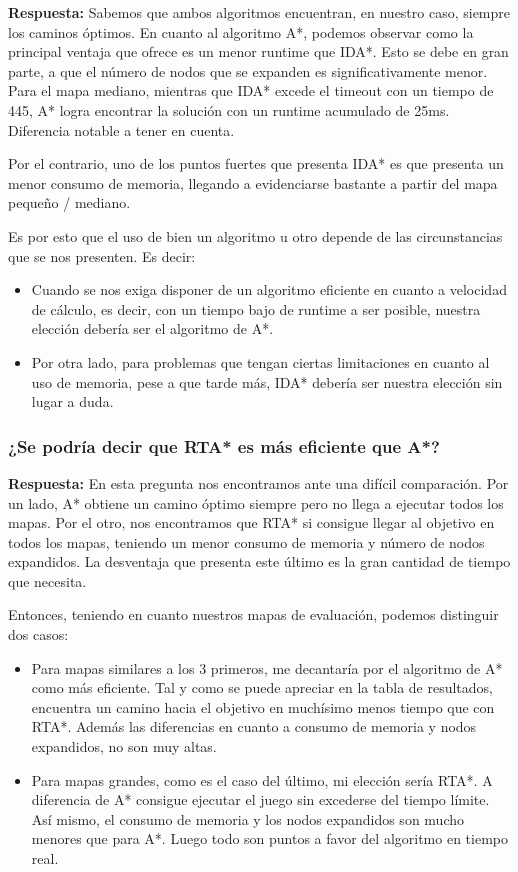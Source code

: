 \documentclass[10pt, a4paper]{article}
\theoremstyle{theorem-style}
\theoremstyle{theorem-style}
\theoremstyle{theorem2-style}
\theoremstyle{definition-style}
\theoremstyle{remark-style}
\theoremstyle{example-style}
\theoremstyle{definition-style}
\theoremstyle{remark-style}
\theoremstyle{remark-style}
\begin{document}
\textbf{Respuesta:} Sabemos que ambos algoritmos encuentran, en nuestro caso, siempre los caminos óptimos. En cuanto al algoritmo A*, podemos observar como la principal ventaja que ofrece es un menor runtime que IDA*. Esto se debe en gran parte, a que el número de nodos que se expanden es significativamente menor. Para el mapa mediano, mientras que IDA* excede el timeout con un tiempo de 445, A* logra encontrar la solución con un runtime acumulado de 25ms. Diferencia notable a tener en cuenta. 

Por el contrario, uno de los puntos fuertes que presenta IDA* es que presenta un menor consumo de memoria, llegando a evidenciarse bastante a partir del mapa pequeño / mediano.

Es por esto que el uso de bien un algoritmo u otro depende de las circunstancias que se nos presenten. Es decir: 

\begin{itemize}
\item Cuando se nos exiga disponer de un algoritmo eficiente en cuanto a velocidad de cálculo, es decir, con un tiempo bajo de runtime a ser posible, nuestra elección debería ser el algoritmo de A*.
\item Por otra lado, para problemas que tengan ciertas limitaciones en cuanto al uso de memoria, pese a que tarde más, IDA* debería ser nuestra elección sin lugar a duda. 
\end{itemize}

\subsubsection*{¿Se podría decir que RTA* es más eficiente que A*?}

\textbf{Respuesta:} En esta pregunta nos encontramos ante una difícil comparación. Por un lado, A* obtiene un camino óptimo siempre pero no llega a ejecutar todos los mapas. Por el otro, nos encontramos que RTA* si consigue llegar al objetivo en todos los mapas, teniendo un menor consumo de memoria y número de nodos expandidos. La desventaja que presenta este último es la gran cantidad de tiempo que necesita. 

Entonces, teniendo en cuanto nuestros mapas de evaluación, podemos distinguir dos casos: 

\begin{itemize}
\item Para mapas similares a los 3 primeros, me decantaría por el algoritmo de A* como más eficiente. Tal y como se puede apreciar en la tabla de resultados, encuentra un camino hacia el objetivo en muchísimo menos tiempo que con RTA*. Además las diferencias en cuanto a consumo de memoria y nodos expandidos, no son muy altas. 
\item Para mapas grandes, como es el caso del último, mi elección sería RTA*. A diferencia de A* consigue ejecutar el juego sin excederse del tiempo límite. Así mismo, el consumo de memoria y los nodos expandidos son mucho menores que para A*. Luego todo son puntos a favor del algoritmo en tiempo real. 
\end{itemize}
\end{document}

